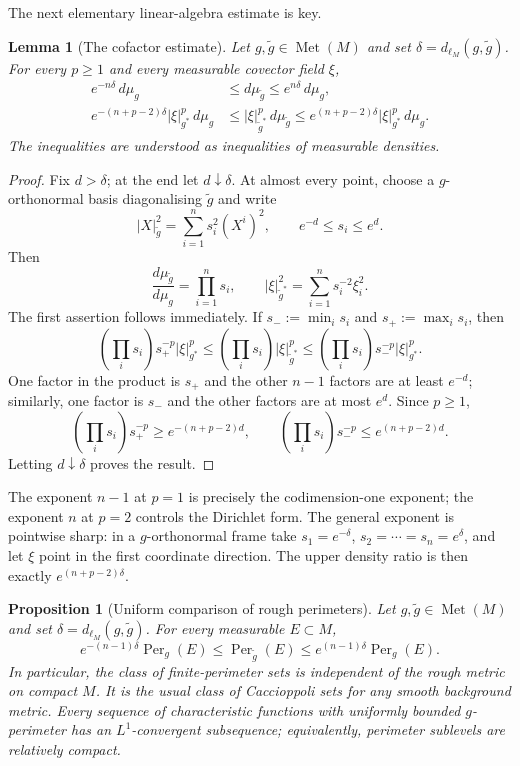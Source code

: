 \documentclass[11pt]{amsart}
\newtheorem{proposition}[theorem]{Proposition}
\newtheorem{lemma}[theorem]{Lemma}
\theoremstyle{definition}
\theoremstyle{remark}
\newcommand{\Met}{\operatorname{Met}}
\newcommand{\dMet}{d_{\ell_M}}
\newcommand{\Per}{\operatorname{Per}}
\begin{document}
The next elementary linear-algebra estimate is key.

\begin{lemma}[The cofactor estimate]\label{lem:cofactor}
Let $g,\widetilde g\in\Met(M)$ and set
$\delta=\dMet(g,\widetilde g)$.  For every $p\geq1$ and every measurable
covector field $\xi$,
\begin{align}
 e^{-n\delta}\,d\mu_g
 &\leq d\mu_{\widetilde g}\leq e^{n\delta}\,d\mu_g,
 \label{eq:measure-comparison}\qquad\\
 e^{-(n+p-2)\delta}|\xi|_{g^*}^p\,d\mu_g
 &\leq |\xi|_{\widetilde g^*}^p\,d\mu_{\widetilde g}
 \leq e^{(n+p-2)\delta}|\xi|_{g^*}^p\,d\mu_g.
 \label{eq:p-energy-comparison}
\end{align}
The inequalities are understood as inequalities of measurable densities.
\end{lemma}

\begin{proof}
Fix $d>\delta$; at the end let $d\downarrow\delta$.  At almost every point,
choose a
$g$-orthonormal basis diagonalising $\widetilde g$ and write
\[
 |X|_{\widetilde g}^2=\sum_{i=1}^n s_i^2(X^i)^2,
 \qquad e^{-d}\leq s_i\leq e^d.
\]
Then
\[
 \frac{d\mu_{\widetilde g}}{d\mu_g}=\prod_{i=1}^n s_i,
 \qquad
 |\xi|_{\widetilde g^*}^2=\sum_{i=1}^n s_i^{-2}\xi_i^2.
\]
The first assertion follows immediately.  If
$s_-:=\min_i s_i$ and $s_+:=\max_i s_i$, then
\[
 \left(\prod_i s_i\right)s_+^{-p}|\xi|_{g^*}^p
 \leq
 \left(\prod_i s_i\right)|\xi|_{\widetilde g^*}^p
 \leq
 \left(\prod_i s_i\right)s_-^{-p}|\xi|_{g^*}^p.
\]
One factor in the product is $s_+$ and the other $n-1$ factors are at
least $e^{-d}$; similarly, one factor is $s_-$ and the other factors
are at most $e^d$.  Since $p\geq1$,
\[
 \left(\prod_i s_i\right)s_+^{-p}\geq e^{-(n+p-2)d},
 \qquad
 \left(\prod_i s_i\right)s_-^{-p}\leq e^{(n+p-2)d}.
\]
Letting $d\downarrow\delta$ proves the result.
\end{proof}

The exponent $n-1$ at $p=1$ is precisely the codimension-one exponent; the
exponent $n$ at $p=2$ controls the Dirichlet form.  The general exponent is
pointwise sharp: in a $g$-orthonormal frame take
$s_1=e^{-\delta}$, $s_2=\cdots=s_n=e^\delta$, and let $\xi$ point in the
first coordinate direction.  The upper density ratio is then exactly
$e^{(n+p-2)\delta}$.

\begin{proposition}[Uniform comparison of rough perimeters]
\label{prop:perimeter-comparison}
Let $g,\widetilde g\in\Met(M)$ and set
$\delta=\dMet(g,\widetilde g)$.  For every measurable $E\subset M$,
\begin{equation}\label{eq:perimeter-comparison}
 e^{-(n-1)\delta}\Per_g(E)
 \leq \Per_{\widetilde g}(E)
 \leq e^{(n-1)\delta}\Per_g(E).
\end{equation}
In particular, the class of finite-perimeter sets is independent of the rough
metric on compact $M$.  It is the usual class of Caccioppoli sets for any
smooth background metric.  Every sequence of characteristic functions with
uniformly bounded $g$-perimeter has an $L^1$-convergent subsequence;
equivalently, perimeter sublevels are relatively compact.
\end{proposition}
\end{document}
